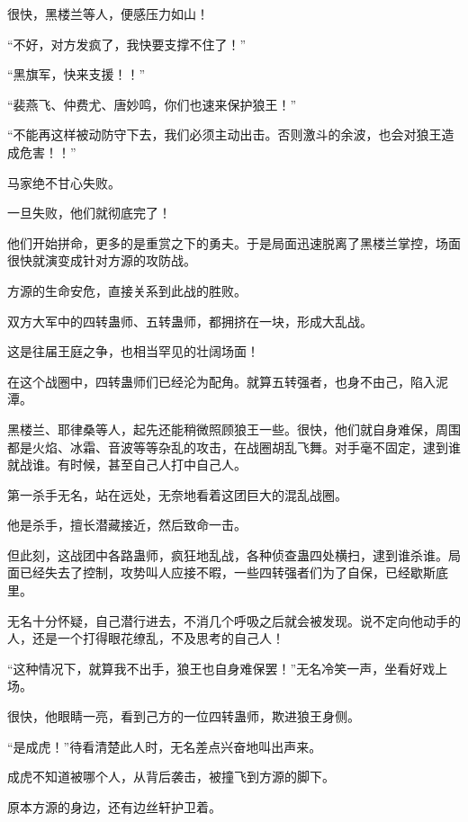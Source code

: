 
\begin{this_body}



很快，黑楼兰等人，便感压力如山！

“不好，对方发疯了，我快要支撑不住了！”

“黑旗军，快来支援！！”

“裴燕飞、仲费尤、唐妙鸣，你们也速来保护狼王！”

“不能再这样被动防守下去，我们必须主动出击。否则激斗的余波，也会对狼王造成危害！！”

马家绝不甘心失败。

一旦失败，他们就彻底完了！

他们开始拼命，更多的是重赏之下的勇夫。于是局面迅速脱离了黑楼兰掌控，场面很快就演变成针对方源的攻防战。

方源的生命安危，直接关系到此战的胜败。

双方大军中的四转蛊师、五转蛊师，都拥挤在一块，形成大乱战。

这是往届王庭之争，也相当罕见的壮阔场面！

在这个战圈中，四转蛊师们已经沦为配角。就算五转强者，也身不由己，陷入泥潭。

黑楼兰、耶律桑等人，起先还能稍微照顾狼王一些。很快，他们就自身难保，周围都是火焰、冰霜、音波等等杂乱的攻击，在战圈胡乱飞舞。对手毫不固定，逮到谁就战谁。有时候，甚至自己人打中自己人。

第一杀手无名，站在远处，无奈地看着这团巨大的混乱战圈。

他是杀手，擅长潜藏接近，然后致命一击。

但此刻，这战团中各路蛊师，疯狂地乱战，各种侦查蛊四处横扫，逮到谁杀谁。局面已经失去了控制，攻势叫人应接不暇，一些四转强者们为了自保，已经歇斯底里。

无名十分怀疑，自己潜行进去，不消几个呼吸之后就会被发现。说不定向他动手的人，还是一个打得眼花缭乱，不及思考的自己人！

“这种情况下，就算我不出手，狼王也自身难保罢！”无名冷笑一声，坐看好戏上场。

很快，他眼睛一亮，看到己方的一位四转蛊师，欺进狼王身侧。

“是成虎！”待看清楚此人时，无名差点兴奋地叫出声来。

成虎不知道被哪个人，从背后袭击，被撞飞到方源的脚下。

原本方源的身边，还有边丝轩护卫着。


\end{this_body}
